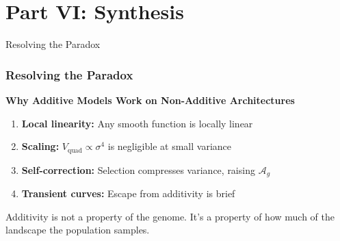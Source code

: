 \documentclass[aspectratio=169,11pt]{beamer}
\newcommand{\Ag}{\mathcal{A}_g}
\newcommand{\Vquad}{V_{\mathrm{quad}}}
\begin{document}
\section{Part VI: Synthesis}

\begin{frame}{Resolving the Paradox}
\frametitle{Resolving the Paradox}

\textbf{Why Additive Models Work on Non-Additive Architectures}

\begin{enumerate}
    \item \textbf{Local linearity:} Any smooth function is locally linear
    \item \textbf{Scaling:} $\Vquad \propto \sigma^4$ is negligible at small variance
    \item \textbf{Self-correction:} Selection compresses variance, raising $\Ag$
    \item \textbf{Transient curves:} Escape from additivity is brief
\end{enumerate}

\vspace{0.5cm}
\begin{alertblock}{}
Additivity is not a property of the genome. It's a property of how much of the landscape the population samples.
\end{alertblock}

\end{frame}
\end{document}
